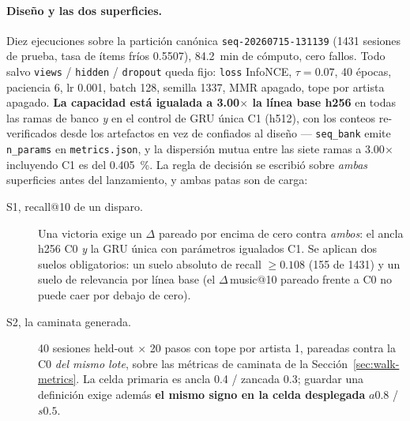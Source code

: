 \documentclass[11pt]{article}
\newcommand{\dsid}[1]{\texttt{\small #1}}
\begin{document}
\paragraph{Diseño y las dos superficies.} Diez ejecuciones sobre la partición
canónica \dsid{seq-20260715-131139} (\num{1431} sesiones de prueba, tasa de ítems
fríos \num{0.5507}), \SI{84.2}{\minute} de cómputo, cero fallos. Todo salvo
\texttt{views} / \texttt{hidden} / \texttt{dropout} queda fijo: \texttt{loss}
InfoNCE, $\tau=\num{0.07}$, \num{40} épocas, paciencia \num{6}, lr \num{0.001},
batch \num{128}, semilla \num{1337}, MMR apagado, tope por artista apagado.
\textbf{La capacidad está igualada a \num{3.00}$\times$ la línea base h256} en
todas las ramas de banco \emph{y} en el control de GRU única C1 (h512), con los
conteos re-verificados desde los artefactos en vez de confiados al diseño ---
\texttt{seq\_bank} emite \texttt{n\_params} en \texttt{metrics.json}, y la
dispersión mutua entre las siete ramas a \num{3.00}$\times$ incluyendo C1 es del
\SI{0.405}{\percent}. La regla de decisión se escribió sobre \emph{ambas}
superficies antes del lanzamiento, y ambas patas son de carga:
\begin{description}
  \item[S1, recall@10 de un disparo.] Una victoria exige un $\Delta$ pareado por
  encima de cero contra \emph{ambos}: el ancla h256 C0 \emph{y} la GRU única con
  parámetros igualados C1. Se aplican dos suelos obligatorios: un suelo absoluto
  de recall $\ge\num{0.108}$ (\num{155} de \num{1431}) y un suelo de relevancia
  por línea base (el $\Delta$\,music@10 pareado frente a C0 no puede caer por
  debajo de cero).
  \item[S2, la caminata generada.] \num{40} sesiones held-out $\times$ \num{20}
  pasos con tope por artista 1, pareadas contra la C0 \emph{del mismo lote}, sobre
  las métricas de caminata de la Sección~\ref{sec:walk-metrics}. La celda
  primaria es ancla \num{0.4} / zancada \num{0.3}; guardar una definición exige
  además \textbf{el mismo signo en la celda desplegada} $a\num{0.8}$ /
  $s\num{0.5}$.
\end{description}
\end{document}

